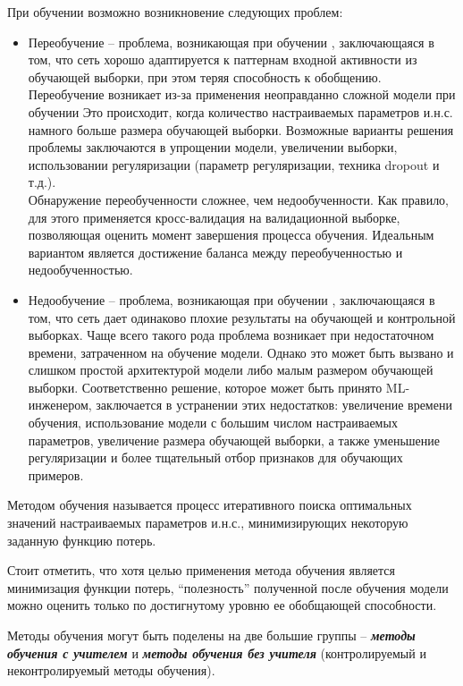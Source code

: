 При обучении возможно возникновение следующих проблем:

\begin{itemize}
	\item Переобучение -- проблема, возникающая при обучении  , заключающаяся в том,
	что сеть хорошо адаптируется к паттернам входной активности из обучающей выборки, при этом теряя способность к обобщению.
	Переобучение возникает из-за применения неоправданно сложной модели при обучении   Это происходит,
	когда количество настраиваемых параметров и.н.с. намного больше размера обучающей выборки. Возможные
	варианты решения проблемы заключаются в упрощении модели, увеличении выборки, использовании регуляризации
	(параметр регуляризации, техника dropout и т.д.).\\
	Обнаружение переобученности сложнее, чем недообученности. Как правило, для этого применяется
	кросс-валидация на валидационной выборке, позволяющая оценить момент завершения процесса обучения.
	Идеальным вариантом является достижение баланса между переобученностью и недообученностью.
	
	\item Недообучение -- проблема, возникающая при обучении  , заключающаяся в том,
	что сеть дает одинаково плохие результаты на обучающей и контрольной выборках.
	Чаще всего такого рода проблема возникает при недостаточном времени, затраченном на обучение модели.
	Однако это может быть вызвано и слишком простой архитектурой модели либо малым размером обучающей
	выборки. Соответственно решение, которое может быть принято ML-инженером, заключается в устранении
	этих недостатков: увеличение времени обучения, использование модели с большим числом настраиваемых
	параметров, увеличение размера обучающей выборки, а также уменьшение регуляризации и более тщательный
	отбор признаков для обучающих примеров.
\end{itemize}

Методом обучения  называется процесс итеративного поиска оптимальных значений настраиваемых параметров и.н.с., минимизирующих некоторую заданную функцию потерь.

Стоит отметить, что хотя целью применения метода обучения является минимизация функции потерь, ``полезность'' полученной после обучения модели можно оценить только по достигнутому уровню ее обобщающей способности.

Методы обучения могут быть поделены на две большие группы -- \textit{\textbf{методы обучения с учителем}} и \textit{\textbf{методы обучения без учителя}} (контролируемый и неконтролируемый методы обучения).

